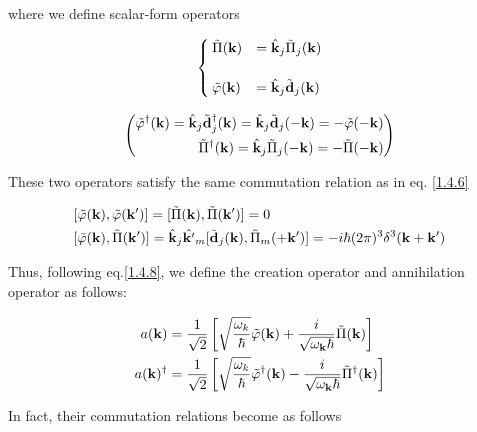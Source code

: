 where we define scalar-form operators

\[\begin{cases}
\tilde{\Pi}({\bf k})& = \hat{\bf k}_j\tilde{\Pi}_j({\bf k})\\
&\\
\tilde{\varphi}({\bf k})& = \hat{\bf k}_j\tilde{\bf d}_j({\bf k})
\end{cases} \]

\[\left(\begin{aligned}
\tilde{\varphi}^\dagger({\bf k})= \hat{\bf k}_j\tilde{\bf d}_j^\dagger({\bf k}) = \hat{\bf k}_j\tilde{\bf d}_j(-{\bf k}) = -\tilde{\varphi}(-\bf k)\\
\tilde{\Pi}^\dagger({\bf k}) = \hat{\bf k}_j\tilde{\Pi}_j(-{\bf k}) = -\tilde{\Pi}(-{\bf k})
\end{aligned}\right) \]

These two operators satisfy the same commutation relation as in eq. \eqref{1.4.6}

\[\begin{split}
&[\tilde\varphi({\bf k}),\tilde\varphi({\bf k'})] = [\tilde\Pi({\bf k}),\tilde\Pi({\bf k'})] = 0\\
&[\tilde\varphi({\bf k}),\tilde\Pi({\bf k'})] = \hat{\bf k}_j\hat{\bf k'}_m[\tilde{\bf d}_j({\bf k}),\tilde\Pi_m({+\bf k'})] = -i\hbar(2\pi)^3\delta^3({\bf k+k'})
\end{split}\]

Thus, following eq.\eqref{1.4.8}, we define the creation operator and annihilation operator as follows:

\[\begin{split}
a({\bf k}) &= \frac{1}{\sqrt{2}}\left[\sqrt{\frac{\omega_k}{\hbar}}\tilde{\varphi}({\bf k})+\frac{i}{\sqrt{\omega_{\bf k}\hbar}}\tilde{\Pi}({\bf k})\right]\\
a({\bf k})^\dagger &= \frac{1}{\sqrt{2}}\left[\sqrt{\frac{\omega_k}{\hbar}}\tilde{\varphi}^\dagger({\bf k})-\frac{i}{\sqrt{\omega_{\bf k}\hbar}}\tilde{\Pi}^\dagger({\bf k})\right]
\end{split} \]

In fact, their commutation relations become as follows

